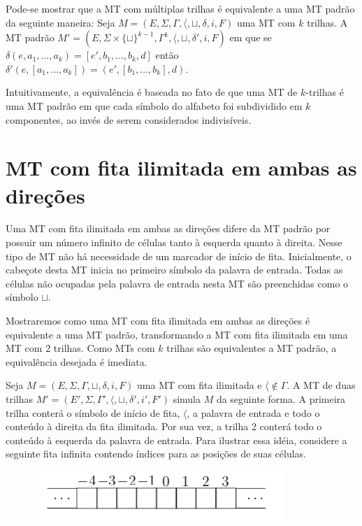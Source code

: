 \documentclass[a4paper]{article}
\theoremstyle{definition}
\begin{document}
  Pode-se mostrar que a MT com múltiplas trilhas é equivalente a uma MT padrão
  da seguinte maneira: Seja $M = (E,\Sigma, \Gamma, \langle, \sqcup, \delta, i,
  F)$ uma MT com $k$ trilhas. A MT padrão $M' = (E, \Sigma \times \{\sqcup\}^{k
    - 1}, \Gamma^k, \langle, \sqcup, \delta', i, F)$ em que se
  $\delta(e,a_1,...,a_k) = [e',b_1,...,b_k,d]$ então $\delta'(e, [a_1,...,a_k])
  = (e',[b_1,...,b_k],d)$.
  
  Intuitivamente, a equivalência é baseada no fato de que uma MT de $k$-trilhas
  é uma MT padrão em que cada símbolo do alfabeto foi subdividido em $k$
  componentes, ao invés de serem considerados indivisíveis.

  \section{MT com fita ilimitada em ambas as direções}

  Uma MT com fita ilimitada em ambas as direções difere da MT padrão por possuir 
  um número infinito de células tanto à esquerda quanto à direita. Nesse tipo de
  MT não há necessidade de um marcador de início de fita. Inicialmente, o
  cabeçote desta MT inicia no primeiro símbolo da palavra de entrada. Todas as
  células não ocupadas pela palavra de entrada nesta MT são preenchidas como o
  símbolo $\sqcup$.


  Mostraremos como uma MT com fita ilimitada em ambas as direções é equivalente
  a uma MT padrão, transformando a MT com fita ilimitada em uma MT com 2
  trilhas. Como MTs com $k$ trilhas são equivalentes a MT padrão, a equivalência
  desejada é imediata.

  Seja $M = (E,\Sigma, \Gamma, \sqcup, \delta, i, F)$ uma
  MT com fita ilimitada e $\langle \not\in \Gamma$. A MT de duas trilhas
  $M' = (E', \Sigma, \Gamma', \langle, \sqcup, \delta', i', F')$ simula $M$ da
  seguinte forma. A primeira trilha conterá o símbolo de início de fita,
  $\langle$, a palavra de entrada e todo o conteúdo à direita da fita ilimitada.
  Por sua vez, a trilha 2 conterá todo o conteúdo à esquerda da palavra de
  entrada. Para ilustrar essa idéia, considere a seguinte fita infinita contendo
  índices para as posições de suas células.
  
  \begin{figure}[H]
    \includegraphics[scale=.8]{infinitetape.png}
    \centering
  \end{figure}
\end{document}
